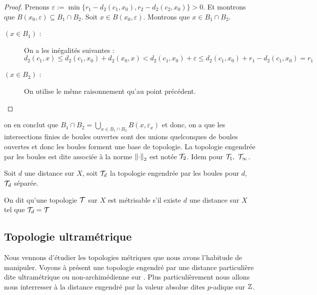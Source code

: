 \begin{proof}
    Prenons $\varepsilon :=\min\{r_1-d_2(c_1,x_0),r_2-d_2(c_2,x_0)\}>0$. Et montrons que $B(x_0,\varepsilon)\subseteq B_1\cap B_2$. Soit $x\in B(x_0,\varepsilon)$. Montrons que $x\in B_1\cap B_2$.
    \begin{description}
        \item[$(x\in B_1)$ :] On a les inégalités suivantes :
        \[
         d_2(c_1,x)\leq d_2(c_1,x_0)+d_2(x_0,x) < d_2(c_1,x_0)+\varepsilon\leq  d_2 (c_1,x_0)+r_1 -d_2(c_1,x_0)=r_1
        \]
        \item[$(x\in B_2)$ :] On utilise le même raisonnement qu'au point précédent.
    \end{description}
\end{proof}
 on en conclut que $B_1\cap B_2=\bigcup_{x\in B_1\cap B_2}B(x,\varepsilon_x)$ et donc, on a que les intersections finies de boules ouvertes sont des unions quelconques de boules ouvertes et donc les boules forment une base de topologie. La topologie engendrée par les boules est dite associée à la norme $\left\| \cdot \right\|_2$ est notée $\mathcal{T}_2$. Idem pour $\mathcal{T}_1,\ \mathcal{T}_\infty$.

 Soit $d$ une distance sur $X$, soit $\mathcal{T}_d$ la topologie engendrée par les boules pour $d$, $\mathcal{T}_d$ séparée.

 \begin{definition}
     On dit qu'une topologie $\mathcal{T}$ sur $X$ est métrisable s'il existe $d$ une distance sur $X$ tel que $\mathcal{T}_d = \mathcal{T}$
 \end{definition}

\subsection{Topologie ultramétrique}

Nous vennons d'étudier les topologies métriques que nous avons l'habitude de manipuler. Voyons à présent une topologie engendré par une distance particulière dite ultramétrique ou non-archimédienne sur . Plus particulièrement nous allons nous interresser à la distance engendré par la valeur absolue dites $p$-adique sur $\mathbb{Z}$.

